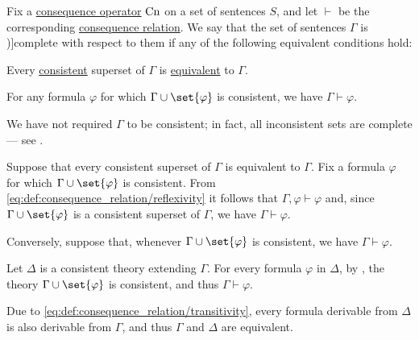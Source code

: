 \begin{definition}\label{def:complete_set_of_sentences}
  Fix a \hyperref[def:consequence_operator]{consequence operator} \( \op{Cn} \) on a set of sentences \( S \), and let \( {\vdash} \) be the corresponding \hyperref[def:consequence_relation]{consequence relation}. We say that the set of sentences \( \Gamma \) is \term[ru=полное (множество формул) (\cite[def. 1.3.16]{Герасимов2011Вычислимость})]{complete} with respect to them if any of the following equivalent conditions hold:
  \begin{thmenum}
     Every \hyperref[def:consistent_set_of_sentences]{consistent} superset of \( \Gamma \) is \hyperref[def:logical_theory/equivalent]{equivalent} to \( \Gamma \).

     For any formula \( \varphi \) for which \( \Gamma \cup \set{ \varphi } \) is consistent, we have \( \Gamma \vdash \varphi \).
  \end{thmenum}
\end{definition}
\begin{comments}
  \item We have not required \( \Gamma \) to be consistent; in fact, all inconsistent sets are complete --- see .
\end{comments}
\begin{defproof}
   Suppose that every consistent superset of \( \Gamma \) is equivalent to \( \Gamma \). Fix a formula \( \varphi \) for which \( \Gamma \cup \set{ \varphi } \) is consistent. From \eqref{eq:def:consequence_relation/reflexivity} it follows that \( \Gamma, \varphi \vdash \varphi \) and, since \( \Gamma \cup \set{ \varphi } \) is a consistent superset of \( \Gamma \), we have \( \Gamma \vdash \varphi \).

   Conversely, suppose that, whenever \( \Gamma \cup \set{ \varphi } \) is consistent, we have \( \Gamma \vdash \varphi \).

  Let \( \Delta \) is a consistent theory extending \( \Gamma \). For every formula \( \varphi \) in \( \Delta \), by , the theory \( \Gamma \cup \set{ \varphi } \) is consistent, and thus \( \Gamma \vdash \varphi \).

  Due to \eqref{eq:def:consequence_relation/transitivity}, every formula derivable from \( \Delta \) is also derivable from \( \Gamma \), and thus \( \Gamma \) and \( \Delta \) are equivalent.
\end{defproof}

